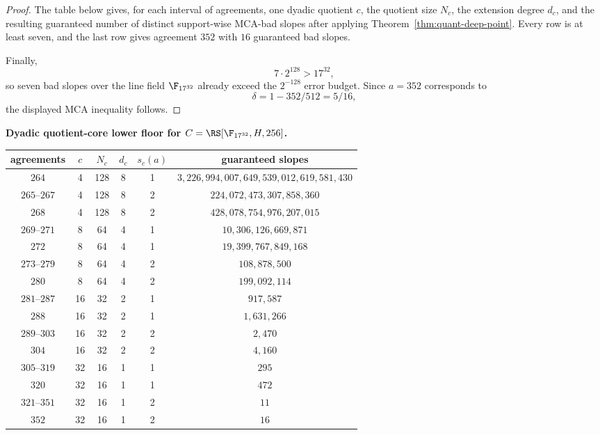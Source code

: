 \begin{proof}
The table below gives, for each interval of agreements, one dyadic quotient
\(c\), the quotient size \(N_c\), the extension degree \(d_c\), and the resulting
guaranteed number of distinct support-wise MCA-bad slopes after applying
Theorem~\ref{thm:quant-deep-point}.  Every row is at least seven, and the last
row gives agreement \(352\) with \(16\) guaranteed bad slopes.

Finally,
\[
  7\cdot2^{128}>17^{32},
\]
so seven bad slopes over the line field \(\F_{17^{32}}\) already exceed the
\(2^{-128}\) error budget.  Since \(a=352\) corresponds to
\[
  \delta=1-352/512=5/16,
\]
the displayed MCA inequality follows.
\end{proof}

\begin{center}
\textbf{Dyadic quotient-core lower floor for \(C=\RS[\F_{17^{32}},H,256]\).}\par\smallskip
\begin{tabular}{c c c c c c}
\textbf{agreements} & \(c\) & \(N_c\) & \(d_c\) & \(s_c(a)\) & guaranteed slopes\\
\hline
\(264\) & 4 & 128 & 8 & 1 & \(3{,}226{,}994{,}007{,}649{,}539{,}012{,}619{,}581{,}430\)\\
\(265\)--\(267\) & 4 & 128 & 8 & 2 & \(224{,}072{,}473{,}307{,}858{,}360\)\\
\(268\) & 4 & 128 & 8 & 2 & \(428{,}078{,}754{,}976{,}207{,}015\)\\
\(269\)--\(271\) & 8 & 64 & 4 & 1 & \(10{,}306{,}126{,}669{,}871\)\\
\(272\) & 8 & 64 & 4 & 1 & \(19{,}399{,}767{,}849{,}168\)\\
\(273\)--\(279\) & 8 & 64 & 4 & 2 & \(108{,}878{,}500\)\\
\(280\) & 8 & 64 & 4 & 2 & \(199{,}092{,}114\)\\
\(281\)--\(287\) & 16 & 32 & 2 & 1 & \(917{,}587\)\\
\(288\) & 16 & 32 & 2 & 1 & \(1{,}631{,}266\)\\
\(289\)--\(303\) & 16 & 32 & 2 & 2 & \(2{,}470\)\\
\(304\) & 16 & 32 & 2 & 2 & \(4{,}160\)\\
\(305\)--\(319\) & 32 & 16 & 1 & 1 & \(295\)\\
\(320\) & 32 & 16 & 1 & 1 & \(472\)\\
\(321\)--\(351\) & 32 & 16 & 1 & 2 & \(11\)\\
\(352\) & 32 & 16 & 1 & 2 & \(16\)
\end{tabular}
\end{center}

